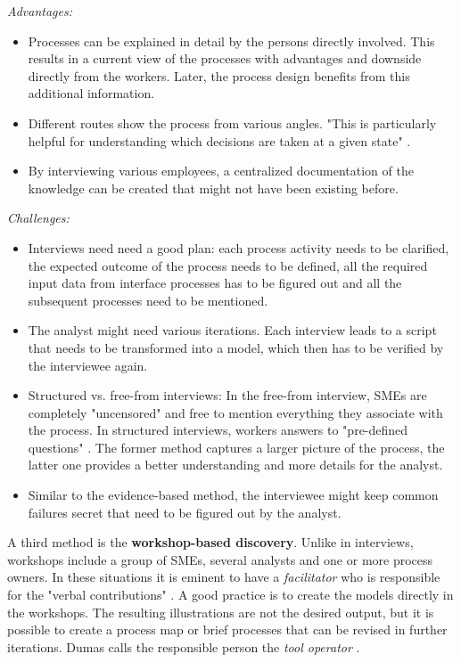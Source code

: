 \textit{Advantages:}
\begin{itemize}
\item Processes can be explained in detail by the persons directly involved. This results in a current view of the processes with advantages and downside directly from the workers. Later, the process design benefits from this additional information.
\item Different routes show the process from various angles. "This is particularly helpful for understanding which decisions are taken at a given state" \cite{Dumas2013}.
\item By interviewing various employees, a centralized documentation of the knowledge can be created that might not have been existing before.
\end{itemize}

\textit{Challenges:}
\begin{itemize}
\item Interviews need need a good plan: each process activity needs to be clarified, the expected outcome of the process needs to be defined, all the required input data from interface processes has to be figured out and all the subsequent processes need to be mentioned. 
\item The analyst might need various iterations. Each interview leads to a script that needs to be transformed into a model, which then has to be verified by the interviewee again.
\item Structured vs. free-from interviews: In the free-from interview, SMEs are completely "uncensored" \cite{Verner2004} and free to mention everything they associate with the process. In structured interviews, workers answers to "pre-defined questions" \cite{Verner2004}. The former method captures a larger picture of the process, the latter one provides a better understanding and more details for the analyst. 
\item Similar to the evidence-based method, the interviewee might keep common failures secret that need to be figured out by the analyst.
\end{itemize}

A third method is the \textbf{workshop-based discovery}. Unlike in interviews, workshops include a group of SMEs, several analysts and one or more process owners. In these situations it is eminent to have a \textit{facilitator} who is responsible for the "verbal contributions" \cite{Dumas2013}. A good practice is to create the models directly in the workshops. The resulting illustrations are not the desired output, but it is possible to create a process map or brief processes that can be revised in further iterations. Dumas calls the responsible person the \textit{tool operator} \cite{Dumas2013}. 

